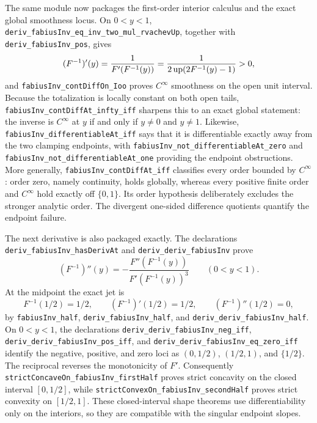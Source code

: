 \documentclass[11pt,oneside]{article}
\theoremstyle{definition}
\theoremstyle{remark}
\begin{document}
The same module now packages the first-order interior calculus and the exact
global smoothness locus.  On \(0<y<1\),
\nolinkurl{deriv_fabiusInv_eq_inv_two_mul_rvachevUp}, together with
\nolinkurl{deriv_fabiusInv_pos}, gives
\[
  (F^{-1})'(y)
    =\frac{1}{F'(F^{-1}(y))}
    =\frac{1}{2\operatorname{up}(2F^{-1}(y)-1)}>0,
\]
and \nolinkurl{fabiusInv_contDiffOn_Ioo} proves \(C^\infty\) smoothness on the
open unit interval.  Because the totalization is locally constant on both
open tails, \nolinkurl{fabiusInv_contDiffAt_infty_iff} sharpens this to an
exact global statement: the inverse is \(C^\infty\) at \(y\) if and only if
\(y\neq0\) and \(y\neq1\).  Likewise,
\nolinkurl{fabiusInv_differentiableAt_iff} says that it is differentiable
exactly away from the two clamping endpoints, with
\nolinkurl{fabiusInv_not_differentiableAt_zero} and
\nolinkurl{fabiusInv_not_differentiableAt_one} providing the endpoint
obstructions.  More generally, \nolinkurl{fabiusInv_contDiffAt_iff}
classifies every order bounded by \(C^\infty\): order zero, namely
continuity, holds globally, whereas every positive finite order and
\(C^\infty\) hold exactly off \(\{0,1\}\).  Its order hypothesis deliberately
excludes the stronger analytic order.  The divergent one-sided difference
quotients quantify the endpoint failure.

The next derivative is also packaged exactly.  The declarations
\nolinkurl{deriv_fabiusInv_hasDerivAt} and
\nolinkurl{deriv_deriv_fabiusInv} prove
\[
  (F^{-1})''(y)
    =-\frac{F''(F^{-1}(y))}{F'(F^{-1}(y))^3}
    \qquad(0<y<1).
\]
At the midpoint the exact jet is
\[
  F^{-1}(1/2)=1/2,\qquad (F^{-1})'(1/2)=1/2,\qquad
  (F^{-1})''(1/2)=0,
\]
by \nolinkurl{fabiusInv_half}, \nolinkurl{deriv_fabiusInv_half}, and
\nolinkurl{deriv_deriv_fabiusInv_half}.  On \(0<y<1\), the declarations
\nolinkurl{deriv_deriv_fabiusInv_neg_iff},
\nolinkurl{deriv_deriv_fabiusInv_pos_iff}, and
\nolinkurl{deriv_deriv_fabiusInv_eq_zero_iff} identify the negative,
positive, and zero loci as \((0,1/2)\), \((1/2,1)\), and \(\{1/2\}\).
The reciprocal reverses the monotonicity of \(F'\).  Consequently
\nolinkurl{strictConcaveOn_fabiusInv_firstHalf} proves strict concavity on the
closed interval \([0,1/2]\), while
\nolinkurl{strictConvexOn_fabiusInv_secondHalf} proves strict convexity on
\([1/2,1]\).  These closed-interval shape theorems use differentiability only
on the interiors, so they are compatible with the singular endpoint slopes.
\end{document}
